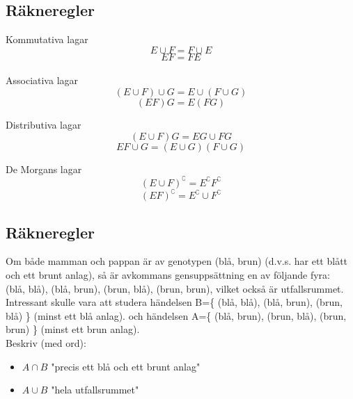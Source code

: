 \documentclass{article}
\begin{document}
\subsection{Räkneregler}
Kommutativa lagar
$$ E\cup F = F\cup E $$
$$ EF=FE $$\\

Associativa lagar
$$ (E\cup F)\cup G = E\cup (F\cup G) $$
$$ (EF)G = E(FG) $$

Distributiva lagar
$$ (E\cup F)G = EG\cup FG $$
$$ EF\cup G = (E\cup G)(F\cup G) $$

De Morgans lagar
$$ (E\cup F)^\complement = E^\complement F^\complement $$
$$ (EF)^\complement = E^\complement \cup F^\complement $$

\subsection{Räkneregler}
Om både mamman och pappan är av genotypen (blå, brun) (d.v.s. har ett blått och ett brunt anlag), så är avkommans gensuppsättning en av följande fyra:\\
(blå, blå), (blå, brun), (brun, blå), (brun, brun), vilket också är utfallsrummet.\\
Intressant skulle vara att studera händelsen B=\{ (blå, blå), (blå, brun), (brun, blå) \} (minst ett blå anlag).
och händelsen A=\{ (blå, brun), (brun, blå), (brun, brun) \} (minst ett brun anlag).\\
Beskriv (med ord):
\begin{itemize}
    \item $A\cap B$ "precis ett blå och ett brunt anlag"
    \item $A\cup B$ "hela utfallsrummet"
\end{itemize}
\end{document}
